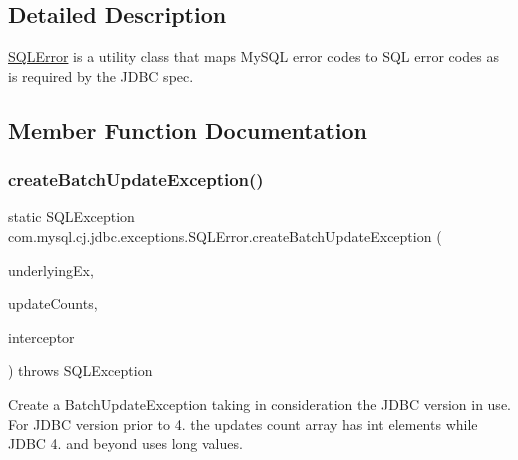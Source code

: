 \subsection{Detailed Description}
\mbox{\hyperlink{classcom_1_1mysql_1_1cj_1_1jdbc_1_1exceptions_1_1_s_q_l_error}{S\+Q\+L\+Error}} is a utility class that maps My\+S\+QL error codes to S\+QL error codes as is required by the J\+D\+BC spec. 

\subsection{Member Function Documentation}
\mbox{\label{classcom_1_1mysql_1_1cj_1_1jdbc_1_1exceptions_1_1_s_q_l_error_ad5fbaafacc50a60f52cff3a129d1c9a8}} 
\subsubsection{\texorpdfstring{create\+Batch\+Update\+Exception()}{createBatchUpdateException()}}
{\footnotesize\ttfamily static S\+Q\+L\+Exception com.\+mysql.\+cj.\+jdbc.\+exceptions.\+S\+Q\+L\+Error.\+create\+Batch\+Update\+Exception (\begin{DoxyParamCaption}\item[{S\+Q\+L\+Exception}]{underlying\+Ex,  }\item[{long \mbox{[}$\,$\mbox{]}}]{update\+Counts,  }\item[{\mbox{\hyperlink{interfacecom_1_1mysql_1_1cj_1_1exceptions_1_1_exception_interceptor}{Exception\+Interceptor}}}]{interceptor }\end{DoxyParamCaption}) throws S\+Q\+L\+Exception\hspace{0.3cm}{\ttfamily [static]}}

Create a Batch\+Update\+Exception taking in consideration the J\+D\+BC version in use. For J\+D\+BC version prior to 4. the updates count array has int elements while J\+D\+BC 4. and beyond uses long values.


